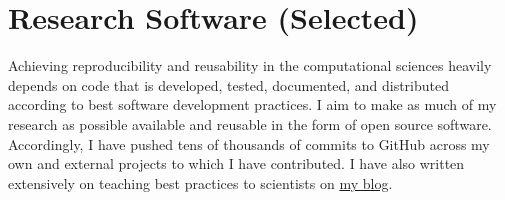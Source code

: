 \documentclass[10pt,a4paper,sans]{moderncv} %
\begin{document}
    \section{Research Software (Selected)}\label{sec:software}

    Achieving reproducibility and reusability in the computational
    sciences heavily depends on code that is developed,
    tested, documented, and distributed according to best software
    development practices. I aim to make as much of my research
    as possible available and reusable in the form of open source
    software. Accordingly, I have pushed tens of thousands of commits
    to GitHub across my own and external projects to which I have
    contributed. I have also written extensively on teaching best
    practices to scientists on \href{https://cthoyt.com/software/}{my blog}.

    \vspace{0.3cm}
\end{document}
